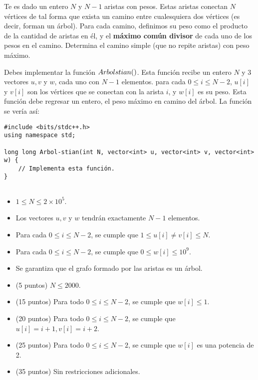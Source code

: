 \documentclass[12pt]{scrartcl}
\begin{document}
    
    
    \vspace{10pt}

    
    
        Te es dado un entero $N$ y $N - 1$ aristas con pesos. Estas aristas conectan $N$ vértices de tal forma que exista un camino entre cualesquiera dos vértices (es decir, forman un árbol). Para cada camino, definimos su peso como el producto de la cantidad de aristas en él, y el {\bfseries máximo común divisor} de cada uno de los pesos en el camino. Determina el camino simple (que no repite aristas) con peso máximo.
    

        Debes implementar la función $Arbol\-stian()$. Esta función recibe un entero $N$ y 3 vectores $u, v$ y $w$, cada uno con $N - 1$ elementos. para cada $0 \le i \le N - 2$, $u[i]$ y $v[i]$ son los vértices que se conectan con la arista $i$, y $w[i]$ es su peso. Esta función debe regresar un entero, el peso máximo en camino del árbol.
        La función se vería así:

\begin{verbatim}
#include <bits/stdc++.h>
using namespace std;

long long Arbol-stian(int N, vector<int> u, vector<int> v, vector<int> w) {
    // Implementa esta función.
}
    
\end{verbatim}

        \begin{itemize}
            \item $1 \le N \le 2\times10^5$.
            \item Los vectores $u, v$ y $w$ tendrán exactamente $N - 1$ elementos.
            \item Para cada $0 \le i \le N - 2$, se cumple que $1 \le u[i] \neq v[i] \le N$. 
            \item Para cada $0 \le i \le N - 2$, se cumple que $0 \le w[i] \le 10^9$.
            \item Se garantiza que el grafo formado por las aristas es un árbol.
        \end{itemize}
    


    \begin{itemize}
        \item (5 puntos) $N \le 2000$.
        \item (15 puntos) Para todo $0 \le i \le N - 2$, se cumple que $w[i] \le 1$.
        \item (20 puntos) Para todo $0 \le i \le N - 2$, se cumple que $u[i] = i + 1, v[i] = i + 2$.
        \item (25 puntos) Para todo $0 \le i \le N - 2$, se cumple que $w[i]$ es una potencia de 2.
        \item (35 puntos) Sin restricciones adicionales.
    \end{itemize}
\end{document}
